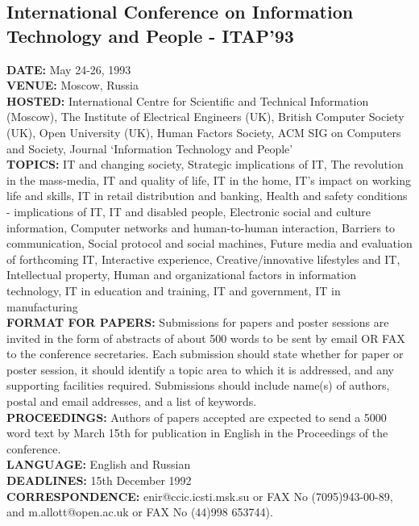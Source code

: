 \subsection{International Conference on Information Technology and People - ITAP'93}
{\bf DATE:} May 24-26, 1993\\
{\bf VENUE:} Moscow, Russia \\
{\bf HOSTED:} International Centre for Scientific and Technical
Information (Moscow), The Institute of Electrical Engineers (UK),
British Computer Society (UK), Open University (UK), Human Factors
Society, ACM SIG on Computers and Society, Journal `Information
Technology and People'\\
{\bf TOPICS:} IT and changing society, Strategic implications of IT,
The revolution in the mass-media, IT and quality of life, IT in the
home, IT's impact on working life and skills, IT in retail
distribution and banking, Health and safety conditions - implications
of IT, IT and disabled people, Electronic social and culture
information, Computer networks and human-to-human interaction,
Barriers to communication, Social protocol and social machines, Future
media and evaluation of forthcoming IT, Interactive experience,
Creative/innovative lifestyles and IT, Intellectual property, Human
and organizational factors in information technology, IT in education
and training, IT and government, IT in manufacturing\\
{\bf FORMAT FOR PAPERS:}
Submissions for papers and poster sessions are invited in the form
of abstracts  of about 500 words to be sent by email OR FAX to the
conference    secretaries.
Each submission  should state whether for paper or poster session,
it should  identify a topic area to which it is addressed, and any
supporting facilities required. Submissions should include name(s)
of authors,  postal and  email addresses,  and a list of keywords.\\
{\bf PROCEEDINGS:} Authors of  papers accepted  are expected to send a
5000 word text by March 15th for publication in English in the
Proceedings of the conference.\\
{\bf LANGUAGE:} English and Russian\\
{\bf DEADLINES:} 15th December 1992\\
{\bf CORRESPONDENCE:} enir@ccic.icsti.msk.su or FAX No
(7095)943-00-89, and m.allott@open.ac.uk or FAX No (44)998 653744).\\

